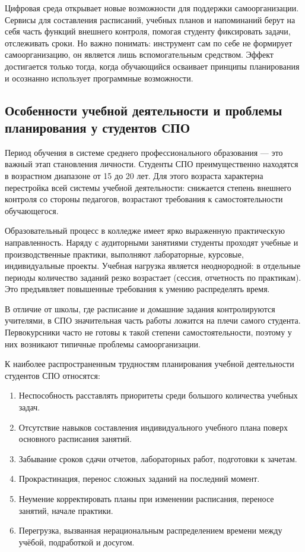 \documentclass[14pt,a4paper]{article}
\begin{document}
Цифровая среда открывает новые возможности для поддержки самоорганизации. Сервисы для составления расписаний, учебных планов и напоминаний берут на себя часть функций внешнего контроля, помогая студенту фиксировать задачи, отслеживать сроки. Но важно понимать: инструмент сам по себе не формирует самоорганизацию, он является лишь вспомогательным средством. Эффект достигается только тогда, когда обучающийся осваивает принципы планирования и осознанно использует программные возможности.


\subsection{Особенности учебной деятельности и проблемы планирования у студентов СПО}

Период обучения в системе среднего профессионального образования — это важный этап становления личности. Студенты СПО преимущественно находятся в возрастном диапазоне от 15 до 20 лет. Для этого возраста характерна перестройка всей системы учебной деятельности: снижается степень внешнего контроля со стороны педагогов, возрастают требования к самостоятельности обучающегося.

Образовательный процесс в колледже имеет ярко выраженную практическую направленность. Наряду с аудиторными занятиями студенты проходят учебные и производственные практики, выполняют лабораторные, курсовые, индивидуальные проекты. Учебная нагрузка является неоднородной: в отдельные периоды количество заданий резко возрастает (сессия, отчетность по практикам). Это предъявляет повышенные требования к умению распределять время.

В отличие от школы, где расписание и домашние задания контролируются учителями, в СПО значительная часть работы ложится на плечи самого студента. Первокурсники часто не готовы к такой степени самостоятельности, поэтому у них возникают типичные проблемы самоорганизации.

К наиболее распространенным трудностям планирования учебной деятельности студентов СПО относятся:
\begin{enumerate}
    \item Неспособность расставлять приоритеты среди большого количества учебных задач.
    \item Отсутствие навыков составления индивидуального учебного плана поверх основного расписания занятий.
    \item Забывание сроков сдачи отчетов, лабораторных работ, подготовки к зачетам.
    \item Прокрастинация, перенос сложных заданий на последний момент.
    \item Неумение корректировать планы при изменении расписания, переносе занятий, начале практики.
    \item Перегрузка, вызванная нерациональным распределением времени между учёбой, подработкой и досугом.
\end{enumerate}
\end{document}
